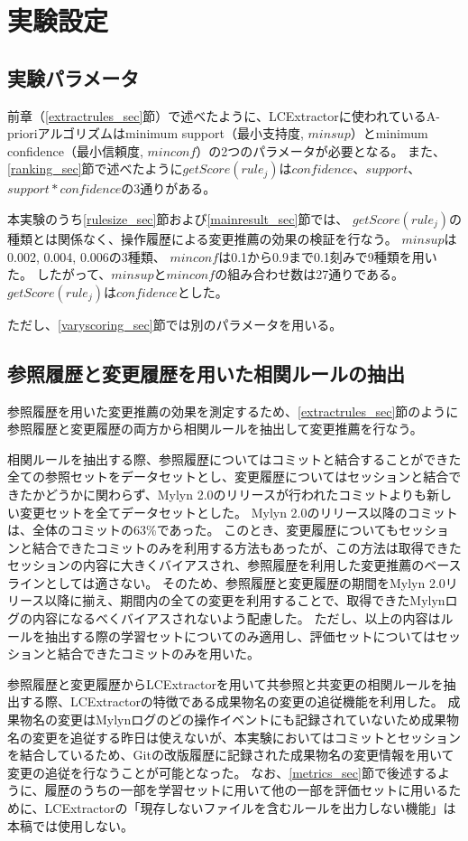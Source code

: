 \documentclass[a4paper]{jsbook}
\newcommand{\minconf}{mincon\!f}
\newcommand{\confidence}{con\!f\!idence}
\newcommand{\getScore}{getS\!core}
\begin{document}
\section{実験設定}\label{setting_sec}
\subsection{実験パラメータ}
前章（\ref{extractrules_sec}節）で述べたように、LCExtractorに使われているA-prioriアルゴリズムはminimum support（最小支持度, $minsup$）とminimum confidence（最小信頼度, $\minconf$）の2つのパラメータが必要となる。
また、\ref{ranking_sec}節で述べたように$\getScore(rule_j)$は$\confidence$、$support$、$support*\confidence$の3通りがある。

本実験のうち\ref{rulesize_sec}節および\ref{mainresult_sec}節では、
$\getScore(rule_j)$の種類とは関係なく、操作履歴による変更推薦の効果の検証を行なう。
$minsup$は0.002, 0.004, 0.006の3種類、
$\minconf$は0.1から0.9まで0.1刻みで9種類を用いた。
したがって、$minsup$と$\minconf$の組み合わせ数は27通りである。
$\getScore(rule_j)$は$\confidence$とした。

ただし、\ref{varyscoring_sec}節では別のパラメータを用いる。


\subsection{参照履歴と変更履歴を用いた相関ルールの抽出}
参照履歴を用いた変更推薦の効果を測定するため、\ref{extractrules_sec}節のように参照履歴と変更履歴の両方から相関ルールを抽出して変更推薦を行なう。

相関ルールを抽出する際、参照履歴についてはコミットと結合することができた全ての参照セットをデータセットとし、変更履歴についてはセッションと結合できたかどうかに関わらず、Mylyn 2.0のリリースが行われたコミットよりも新しい変更セットを全てデータセットとした。
Mylyn 2.0のリリース以降のコミットは、全体のコミットの63\%であった。
このとき、変更履歴についてもセッションと結合できたコミットのみを利用する方法もあったが、この方法は取得できたセッションの内容に大きくバイアスされ、参照履歴を利用した変更推薦のベースラインとしては適さない。
そのため、参照履歴と変更履歴の期間をMylyn 2.0リリース以降に揃え、期間内の全ての変更を利用することで、取得できたMylynログの内容になるべくバイアスされないよう配慮した。
ただし、以上の内容はルールを抽出する際の学習セットについてのみ適用し、評価セットについてはセッションと結合できたコミットのみを用いた。

参照履歴と変更履歴からLCExtractorを用いて共参照と共変更の相関ルールを抽出する際、LCExtractorの特徴である成果物名の変更の追従機能を利用した。
成果物名の変更はMylynログのどの操作イベントにも記録されていないため成果物名の変更を追従する昨日は使えないが、本実験においてはコミットとセッションを結合しているため、Gitの改版履歴に記録された成果物名の変更情報を用いて変更の追従を行なうことが可能となった。
なお、\ref{metrics_sec}節で後述するように、履歴のうちの一部を学習セットに用いて他の一部を評価セットに用いるために、LCExtractorの「現存しないファイルを含むルールを出力しない機能」は本稿では使用しない。
\end{document}
